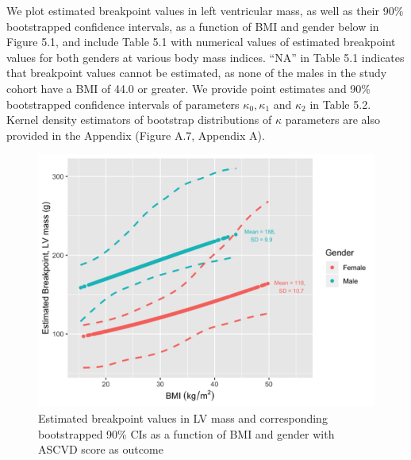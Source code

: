 \documentclass [12pt, proquest] {uwthesis}[2016/11/22]
\begin{document}
We plot estimated breakpoint values in left ventricular mass, as well as their 90\% bootstrapped confidence intervals, as a function of BMI and gender below in Figure 5.1, and include Table 5.1 with numerical values of estimated breakpoint values for both genders at various body mass indices. ``NA'' in Table 5.1 indicates that breakpoint values cannot be estimated, as none of the males in the study cohort have a BMI of 44.0 or greater. We provide point estimates and 90\% bootstrapped confidence intervals of parameters $\kappa_0, \kappa_1$ and $\kappa_2$ in Table 5.2. Kernel density estimators of bootstrap distributions of $\kappa$ parameters are also provided in the Appendix (Figure A.7, Appendix A).

\begin{figure}
    \centering
    \includegraphics[width = 6 in]{Plot5_1.png}
    \caption{Estimated breakpoint values in LV mass and corresponding bootstrapped 90\% CIs as a function of BMI and gender with ASCVD score as outcome}
\end{figure}
\end{document}
